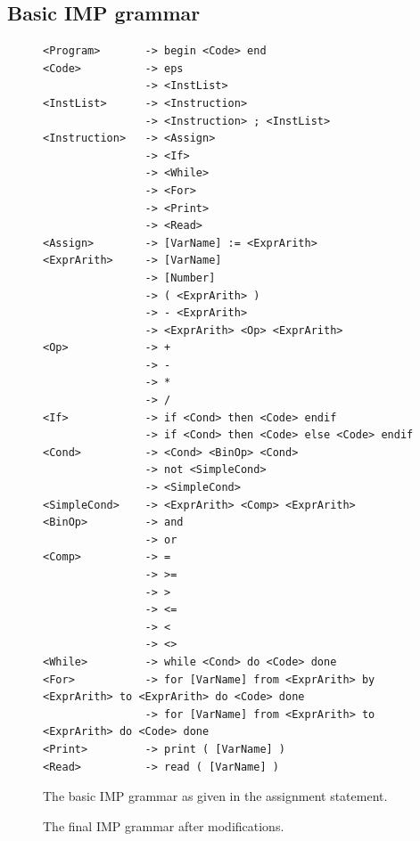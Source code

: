 \documentclass[a4paper,11pt]{article}
\begin{document}
  \subsection{Basic IMP grammar}
    \begin{figure}[h!]
      \centering
      \begin{lstlisting}
<Program>       -> begin <Code> end
<Code>          -> eps
                -> <InstList>
<InstList>      -> <Instruction>
                -> <Instruction> ; <InstList>
<Instruction>   -> <Assign>
                -> <If>
                -> <While>
                -> <For>
                -> <Print>
                -> <Read>
<Assign>        -> [VarName] := <ExprArith>
<ExprArith>     -> [VarName]
                -> [Number]
                -> ( <ExprArith> )
                -> - <ExprArith>
                -> <ExprArith> <Op> <ExprArith>
<Op>            -> +
                -> -
                -> *
                -> /
<If>            -> if <Cond> then <Code> endif
                -> if <Cond> then <Code> else <Code> endif
<Cond>          -> <Cond> <BinOp> <Cond>
                -> not <SimpleCond>
                -> <SimpleCond>
<SimpleCond>    -> <ExprArith> <Comp> <ExprArith>
<BinOp>         -> and
                -> or
<Comp>          -> = 
                -> >= 
                -> > 
                -> <= 
                -> < 
                -> <> 
<While>         -> while <Cond> do <Code> done
<For>           -> for [VarName] from <ExprArith> by <ExprArith> to <ExprArith> do <Code> done
                -> for [VarName] from <ExprArith> to <ExprArith> do <Code> done
<Print>         -> print ( [VarName] )
<Read>          -> read ( [VarName] )
      \end{lstlisting}
      \caption{The basic IMP grammar as given in the assignment statement.}
      \label{fig:basicimpgrammar}
    \end{figure}
    
    \begin{figure}[h!]
      \centering
      
      \caption{The final IMP grammar after modifications.}
      \label{fig:finalimpgrammar}
    \end{figure}
    
\end{document}
